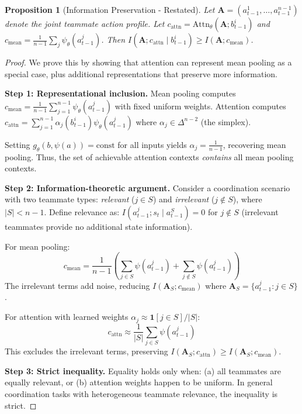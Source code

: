 \documentclass{article}
\theoremstyle{plain}
\newtheorem{proposition}[theorem]{Proposition}
\theoremstyle{definition}
\theoremstyle{remark}
\begin{document}
\begin{proposition}[Information Preservation - Restated]
Let $\mathbf{A} = (a_{t-1}^1, \ldots, a_{t-1}^{n-1})$ denote the joint teammate action profile. Let $c_{\mathrm{attn}} = \mathrm{Attn}_\theta(\mathbf{A}; b_{t-1}^i)$ and $c_{\mathrm{mean}} = \frac{1}{n-1}\sum_j \psi_\theta(a_{t-1}^j)$. Then $I(\mathbf{A}; c_{\mathrm{attn}} \mid b_{t-1}^i) \geq I(\mathbf{A}; c_{\mathrm{mean}})$.
\end{proposition}

\begin{proof}
We prove this by showing that attention can represent mean pooling as a special case, plus additional representations that preserve more information.

\textbf{Step 1: Representational inclusion.}
Mean pooling computes $c_{\mathrm{mean}} = \frac{1}{n-1}\sum_{j=1}^{n-1} \psi_\theta(a_{t-1}^j)$ with fixed uniform weights.
Attention computes $c_{\mathrm{attn}} = \sum_{j=1}^{n-1} \alpha_j(b_{t-1}^i) \psi_\theta(a_{t-1}^j)$ where $\alpha_j \in \Delta^{n-2}$ (the simplex).

Setting $g_\theta(b, \psi(a)) = \text{const}$ for all inputs yields $\alpha_j = \frac{1}{n-1}$, recovering mean pooling. Thus, the set of achievable attention contexts \emph{contains} all mean pooling contexts.

\textbf{Step 2: Information-theoretic argument.}
Consider a coordination scenario with two teammate types: \emph{relevant} ($j \in S$) and \emph{irrelevant} ($j \notin S$), where $|S| < n-1$. Define relevance as: $I(a_{t-1}^j; s_t \mid a_{t-1}^S) = 0$ for $j \notin S$ (irrelevant teammates provide no additional state information).

For mean pooling:
\[
c_{\mathrm{mean}} = \frac{1}{n-1}\left(\sum_{j \in S} \psi(a_{t-1}^j) + \sum_{j \notin S} \psi(a_{t-1}^j)\right)
\]
The irrelevant terms add noise, reducing $I(\mathbf{A}_S; c_{\mathrm{mean}})$ where $\mathbf{A}_S = \{a_{t-1}^j : j \in S\}$.

For attention with learned weights $\alpha_j \approx \mathbf{1}[j \in S] / |S|$:
\[
c_{\mathrm{attn}} \approx \frac{1}{|S|}\sum_{j \in S} \psi(a_{t-1}^j)
\]
This excludes the irrelevant terms, preserving $I(\mathbf{A}_S; c_{\mathrm{attn}}) \geq I(\mathbf{A}_S; c_{\mathrm{mean}})$.

\textbf{Step 3: Strict inequality.}
Equality holds only when: (a) all teammates are equally relevant, or (b) attention weights happen to be uniform. In general coordination tasks with heterogeneous teammate relevance, the inequality is strict.
\end{proof}
\end{document}
